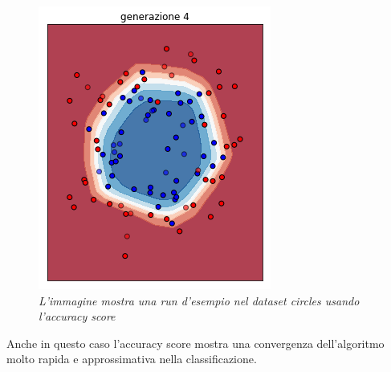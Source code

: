 \documentclass[12pt,a4paper]{report}
\begin{document}
\begin{figure}[H]
 \includegraphics[scale = 0.4]{images/circles-rnd-acc/4}
 \caption{\textit{L'immagine mostra una run d'esempio nel dataset circles usando l'accuracy score}}
 \label{circles1}
\end{figure}

Anche in questo caso l'accuracy score mostra una convergenza dell'algoritmo molto rapida e approssimativa nella classificazione.
\end{document}
